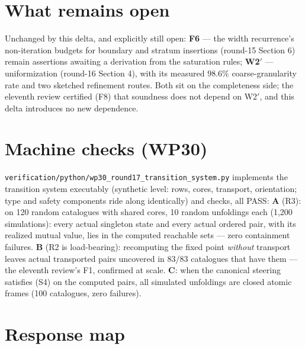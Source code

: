 \documentclass[11pt]{article}
\theoremstyle{definition}
\newcommand{\code}[1]{\texttt{#1}}
\begin{document}
\section{What remains open}\label{sec:open}

Unchanged by this delta, and explicitly still open: \textbf{F6} --- the
width recurrence's non-iteration budgets for boundary and stratum
insertions (round-15 Section 6) remain assertions awaiting a derivation
from the saturation rules; \textbf{W2$'$} --- uniformization (round-16
Section 4), with its measured $98.6\%$ coarse-granularity rate and two
sketched refinement routes.  Both sit on the completeness side; the
eleventh review certified (F8) that soundness does not depend on
W2$'$, and this delta introduces no new dependence.

\section{Machine checks (WP30)}\label{sec:wp}

\code{verification/python/wp30\_round17\_transition\_system.py}
implements the transition system executably (synthetic level: rows,
cores, transport, orientation; type and safety components ride along
identically) and checks, all PASS:
\textbf{A} (R3): on 120 random catalogues with shared cores, 10 random
unfoldings each (1{,}200 simulations): every actual singleton state and
every actual ordered pair, with its realized mutual value, lies in the
computed reachable sets --- zero containment failures.
\textbf{B} (R2 is load-bearing): recomputing the fixed point
\emph{without} transport leaves actual transported pairs uncovered in
$83/83$ catalogues that have them --- the eleventh review's F1, confirmed
at scale.
\textbf{C}: when the canonical steering satisfies (S4) on the computed
pairs, all simulated unfoldings are closed atomic frames (100
catalogues, zero failures).

\section{Response map}\label{sec:resp}
\end{document}
